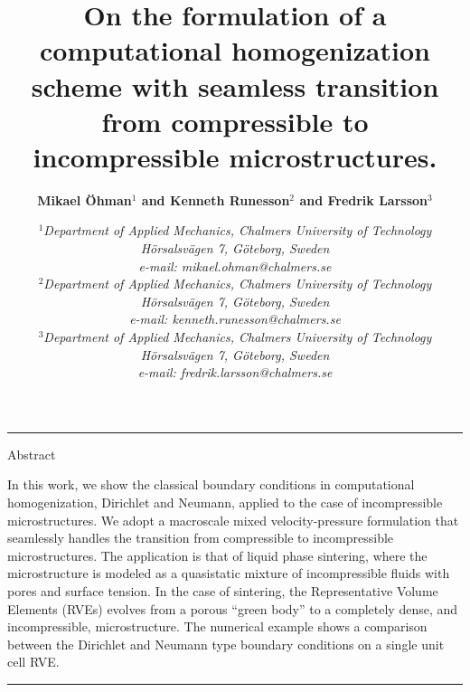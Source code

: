 \documentclass[notitlepage,a4paper,fleqn,9pt]{extarticle}
\title{\bfseries
On the formulation of a computational homogenization scheme with seamless transition from compressible to incompressible microstructures.
}
\author{\normalsize\bfseries
Mikael Öhman$^1$ and Kenneth Runesson$^2$ and Fredrik Larsson$^3$
}
\date{\normalsize\vspace{-2ex}\em
$^1$Department of Applied Mechanics, Chalmers University of Technology\\
Hörsalsvägen 7, Göteborg, Sweden\\
e-mail: mikael.ohman@chalmers.se\\[1.1mm]
%
$^2$Department of Applied Mechanics, Chalmers University of Technology\\
Hörsalsvägen 7, Göteborg, Sweden\\
e-mail: kenneth.runesson@chalmers.se\\[1.1mm]
%
$^3$Department of Applied Mechanics, Chalmers University of Technology\\
Hörsalsvägen 7, Göteborg, Sweden\\
e-mail: fredrik.larsson@chalmers.se
}
\begin{document}
\raggedcolumns

\maketitle
\vspace{-3mm}
\noindent\rule{\textwidth}{.1pt}

\noindent
Abstract\\
\vspace{1ex}

\noindent 
In this work, we show the classical boundary conditions in computational homogenization, Dirichlet and Neumann, applied to the case of incompressible microstructures.
We adopt a macroscale mixed velocity-pressure formulation that seamlessly handles the transition from compressible to incompressible microstructures.
The application is that of liquid phase sintering, where the microstructure is modeled as a quasistatic mixture of incompressible fluids with pores and surface tension. 
In the case of sintering, the Representative Volume Elements (RVEs) evolves from a porous ``green body'' to a completely dense, and incompressible, microstructure.
The numerical example shows a comparison between the Dirichlet and Neumann type boundary conditions on a single unit cell RVE.
\vspace{1ex}


\noindent\rule{\textwidth}{.1pt}
\vspace{2mm}
\end{document}
